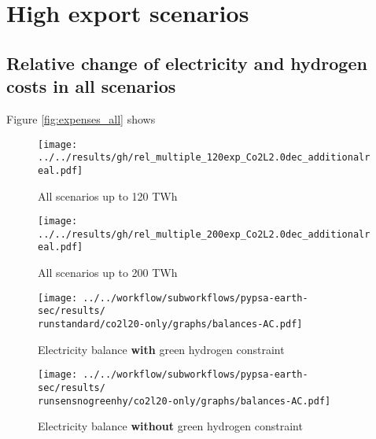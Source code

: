 \section{High export scenarios}

\subsection{Relative change of electricity and hydrogen costs in all scenarios}
Figure \ref{fig:expenses_all} shows 



\begin{figure*}[h!]
    \centering
    \begin{subfigure}[b]{0.49\linewidth}
        \centering
        \texttt{[image: ../../results/gh/rel\_multiple\_120exp\_Co2L2.0dec\_additionalreal.pdf]}
        \caption{All scenarios up to 120 TWh}
        \label{fig:expenses_all_120}
    \end{subfigure}
    \hfill
    \begin{subfigure}[b]{0.49\linewidth}
        \centering
        \texttt{[image: ../../results/gh/rel\_multiple\_200exp\_Co2L2.0dec\_additionalreal.pdf]}
        \caption{All scenarios up to 200 TWh}
        \label{fig:expenses_all_200}
    \end{subfigure}
    \hfill
    \caption{Supplement to Fig. \ref{fig:expenses_real_120}. Relative change of electricity and hydrogen expenses and total system cost depending on the green hydrogen regulation. Domestic electricity consumers profit across all export and mitigation scenarios but most at high export and low mitigation. Hydrogen exporters experience higher expenses with stricter hydrogen regulation. The hydrogen regulation regulates the welfare distribution between both groups.}
    \label{fig:expenses_all}
\end{figure*}


\begin{figure*}[h!]
    \centering
    \begin{subfigure}[b]{0.49\linewidth}
        \centering
        \texttt{[image: ../../workflow/subworkflows/pypsa-earth-sec/results/\\runstandard/co2l20-only/graphs/balances-AC.pdf]}
        \caption{Electricity balance {\bf with} green hydrogen constraint}
        \label{fig:balances_AC_monthlymatch}
    \end{subfigure}
    \hfill
    \begin{subfigure}[b]{0.49\linewidth}
        \centering
        \texttt{[image: ../../workflow/subworkflows/pypsa-earth-sec/results/\\runsensnogreenhy/co2l20-only/graphs/balances-AC.pdf]}
        \caption{Electricity balance {\bf without} green hydrogen constraint}
        \label{fig:balances_AC_nogreen}
    \end{subfigure}
    \hfill
    \caption{Electricity balance ramp up from 0--200 TWh with (\ref{fig:balances_AC_monthlymatch}) and without (\ref{fig:balances_AC_nogreen}) green hydrogen constraint}
    \label{fig:barplotscons}
\end{figure*}
